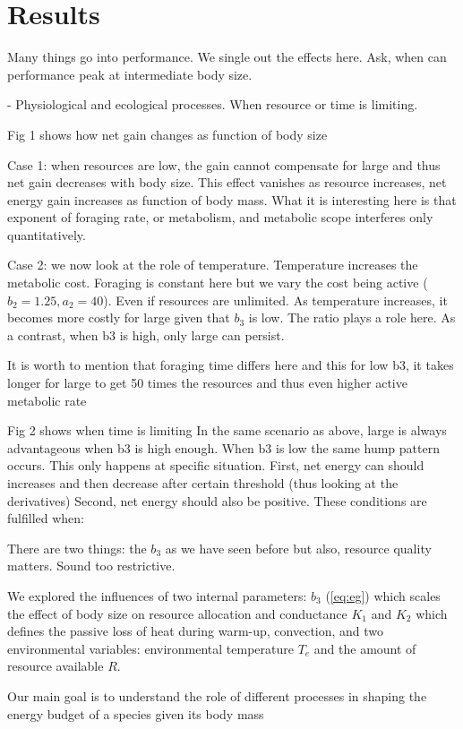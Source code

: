 \section*{Results}
 Many things go into performance. We  single out the effects here.
 Ask, when can performance peak at intermediate body size.

- Physiological and ecological processes.
When resource or time is limiting.

Fig 1 shows how net gain changes as function of body size

 Case 1: when resources are low, the gain cannot compensate for large and thus net gain decreases with body size. 
 This effect vanishes as resource increases, net energy gain increases as function of body mass.
 What it is interesting here is that exponent of foraging rate, or metabolism, and metabolic scope interferes only quantitatively. 
 
 Case 2: we now look at the role of temperature.
 Temperature increases the metabolic cost.
 Foraging is constant here but we vary the cost being active ($b_2 = 1.25, a_2 = 40$).
 Even if resources are unlimited.
 As temperature increases, it becomes more costly for large given that $b_3$ is low. 
 The ratio plays a role here.
 As a contrast, when b3 is high, only large can persist. 

 It is worth to mention that foraging time differs here and this for low b3, it takes longer for large to get 50 times the resources and thus even higher active metabolic rate   
 
 Fig 2 shows when time is limiting
 In the same scenario as above, large is always advantageous when b3 is high enough.
 When b3 is low the same hump pattern occurs.
This only happens at specific situation.
First, net energy can should increases and then decrease after certain threshold (thus looking at the derivatives)
Second, net energy should also be positive.
These conditions are fulfilled when: 

 There are two things: the $b_3$ as we have seen before but also, resource quality matters.
 Sound too restrictive. 
 

We explored the influences of two internal parameters: $b_3$ (\cref{eq:eg}) which scales the effect of body size on resource allocation and conductance $K_1$ and $K_2$ which defines the passive loss of heat during warm-up, convection, and two environmental variables: environmental temperature $T_e$ and the amount of resource available $R$.

Our main goal is to understand the role of different processes in shaping the energy budget of a species given its body mass

